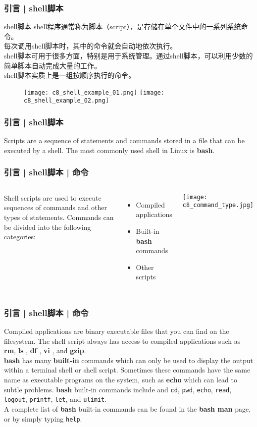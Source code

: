 \begin{frame}
  \frametitle{引言 | shell脚本}
  \begin{block}{shell脚本}
    shell程序通常称为脚本（script），是存储在单个文件中的一系列系统命令。\\
    每次调用shell脚本时，其中的命令就会自动地依次执行。\\
    shell脚本可用于很多方面，特别是用于系统管理。通过shell脚本，可以利用少数的简单脚本自动完成大量的工作。\\
    shell脚本实质上是一组按顺序执行的命令。
  \end{block}
  \begin{figure}
    \centering
    \texttt{[image: c8\_shell\_example\_01.png]}
    \texttt{[image: c8\_shell\_example\_02.png]}
  \end{figure}
\end{frame}

\begin{frame}
  \frametitle{引言 | shell脚本}
  Scripts are a sequence of statements and commands stored in a file that can be executed by a shell. The most commonly used shell in Linux is \textbf{bash}.
\end{frame}

\begin{frame}
  \frametitle{引言 | shell脚本 | 命令}
  \begin{columns}
  Shell scripts are used to execute sequences of commands and other types of statements. Commands can be divided into the following categories:
  \begin{itemize}
    \item Compiled applications
    \item Built-in \textbf{bash} commands
    \item Other scripts
  \end{itemize}
    \texttt{[image: c8\_command\_type.jpg]}
  \end{columns}
\end{frame}

\begin{frame}[fragile]
  \frametitle{引言 | shell脚本 | 命令}
  Compiled applications are binary executable files that you can find on
  the filesystem. The shell script always has access to compiled
  applications such as \textbf{rm}, \textbf{ls} , \textbf{df} ,
  \textbf{vi} , and \textbf{gzip}.\\
  \vspace{0.3cm}
  \textbf{bash} has many \textbf{built-in} commands which can only be used to display the output within a terminal shell or shell script. Sometimes these commands have the same name as executable programs on the system, such as \textbf{echo} which can lead to subtle problems. \textbf{bash} built-in commands include and \verb|cd|, \verb|pwd|, \verb|echo|, \verb|read|, \verb|logout|, \verb|printf|, \verb|let|, and \verb|ulimit|.\\
  \vspace{0.3cm}
  A complete list of \textbf{bash} built-in commands can be found in the \textbf{bash man} page, or by simply typing \verb|help|.
\end{frame}

